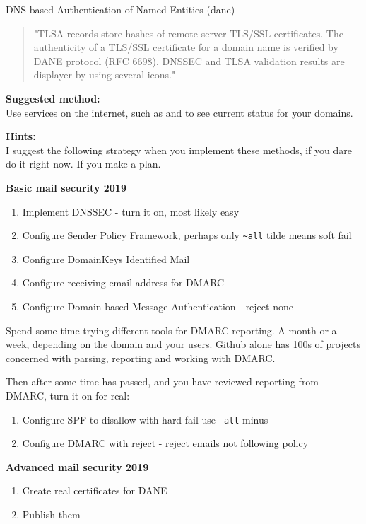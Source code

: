 \documentclass[a4paper,11pt,notitlepage]{report}
\begin{document}
DNS-based Authentication of Named Entities (dane)
\begin{quote}
"TLSA records store hashes of remote server TLS/SSL certificates. The authenticity of a TLS/SSL certificate for a domain name is verified by DANE protocol (RFC 6698). DNSSEC and TLSA validation results are displayer by using several icons."
\end{quote}


{\bf Suggested method:}\\
Use services on the internet, such as  and  to see current status for your domains.

{\bf Hints:}\\
I suggest the following strategy when you implement these methods, if you dare do it right now. If you make a plan.

{\bf Basic mail security 2019}
\begin{enumerate}
\item Implement DNSSEC - turn it on, most likely easy
\item Configure Sender Policy Framework, perhaps only \verb+~all+ tilde means soft fail
\item Configure DomainKeys Identified Mail
\item Configure receiving email address for DMARC
\item Configure Domain-based Message Authentication - reject none
\end{enumerate}

Spend some time trying different tools for DMARC reporting. A month or a week, depending on the domain and your users. Github alone has 100s of projects concerned with parsing, reporting and working with DMARC.

Then after some time has passed, and you have reviewed reporting from DMARC, turn it on for real:
\begin{enumerate}
\item Configure SPF to disallow with hard fail use \verb+-all+ minus
\item Configure DMARC with reject - reject emails not following policy
\end{enumerate}

{\bf Advanced mail security 2019}
\begin{enumerate}
\item Create real certificates for DANE
\item Publish them \smiley
\end{enumerate}
\end{document}
